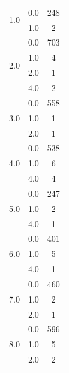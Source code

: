 \begin{longtable}{|c|c|c|c|c|}
\hline
\multirow{2}{*}{1.0} & \multicolumn{2}{c|}{0.0} & \multicolumn{2}{c|}{248} \\
& \multicolumn{2}{c|}{1.0} & \multicolumn{2}{c|}{2} \\
\hline
\multirow{4}{*}{2.0} & \multicolumn{2}{c|}{0.0} & \multicolumn{2}{c|}{703} \\
& \multicolumn{2}{c|}{1.0} & \multicolumn{2}{c|}{4} \\
& \multicolumn{2}{c|}{2.0} & \multicolumn{2}{c|}{1} \\
& \multicolumn{2}{c|}{4.0} & \multicolumn{2}{c|}{2} \\
\hline
\multirow{3}{*}{3.0} & \multicolumn{2}{c|}{0.0} & \multicolumn{2}{c|}{558} \\
& \multicolumn{2}{c|}{1.0} & \multicolumn{2}{c|}{1} \\
& \multicolumn{2}{c|}{2.0} & \multicolumn{2}{c|}{1} \\
\hline
\multirow{3}{*}{4.0} & \multicolumn{2}{c|}{0.0} & \multicolumn{2}{c|}{538} \\
& \multicolumn{2}{c|}{1.0} & \multicolumn{2}{c|}{6} \\
& \multicolumn{2}{c|}{4.0} & \multicolumn{2}{c|}{4} \\
\hline
\multirow{3}{*}{5.0} & \multicolumn{2}{c|}{0.0} & \multicolumn{2}{c|}{247} \\
& \multicolumn{2}{c|}{1.0} & \multicolumn{2}{c|}{2} \\
& \multicolumn{2}{c|}{4.0} & \multicolumn{2}{c|}{1} \\
\hline
\multirow{3}{*}{6.0} & \multicolumn{2}{c|}{0.0} & \multicolumn{2}{c|}{401} \\
& \multicolumn{2}{c|}{1.0} & \multicolumn{2}{c|}{5} \\
& \multicolumn{2}{c|}{4.0} & \multicolumn{2}{c|}{1} \\
\hline
\multirow{3}{*}{7.0} & \multicolumn{2}{c|}{0.0} & \multicolumn{2}{c|}{460} \\
& \multicolumn{2}{c|}{1.0} & \multicolumn{2}{c|}{2} \\
& \multicolumn{2}{c|}{2.0} & \multicolumn{2}{c|}{1} \\
\hline
\multirow{3}{*}{8.0} & \multicolumn{2}{c|}{0.0} & \multicolumn{2}{c|}{596} \\
& \multicolumn{2}{c|}{1.0} & \multicolumn{2}{c|}{5} \\
& \multicolumn{2}{c|}{2.0} & \multicolumn{2}{c|}{2} \\
\hline

\end{longtable}
